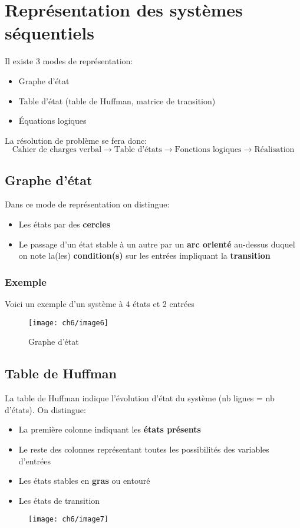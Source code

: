 \section{Représentation des systèmes séquentiels}
Il existe 3 modes de représentation:
\begin{itemize}
	\item Graphe d'état
	\item Table d'état (table de Huffman, matrice de transition)
	\item Équations logiques
\end{itemize}
La résolution de problème se fera donc: 
$$ \text{Cahier de charges verbal}\rightarrow\text{Table d'états}\rightarrow\text{Fonctions logiques}\rightarrow\text{Réalisation} $$
\subsection{Graphe d'état}
Dans ce mode de représentation on distingue:
\begin{itemize}
	\item Les états par des \textbf{cercles}
	\item Le passage d'un état stable à un autre par un \textbf{arc orienté} au-dessus duquel on note la(les) \textbf{condition(s)} sur les entrées impliquant la \textbf{transition}
\end{itemize}
\subsubsection{Exemple}
Voici un exemple d'un système à 4 états et 2 entrées
\begin{figure}[H]
	\centering
	\texttt{[image: ch6/image6]}
	\caption{Graphe d'état}
	\label{fig:graphetat}
\end{figure}
\subsection{Table de Huffman}
La table de Huffman indique l'évolution d'état du système (nb lignes = nb d'états). On distingue:
\begin{itemize}
	\item La première colonne indiquant les \textbf{états présents}
	\item Le reste des colonnes représentant toutes les possibilités des variables d'entrées
	\item Les états stables en \textbf{gras} ou entouré
	\item Les états de transition
\end{itemize}
\begin{figure}[H]
	\centering
	\texttt{[image: ch6/image7]}
\end{figure}
